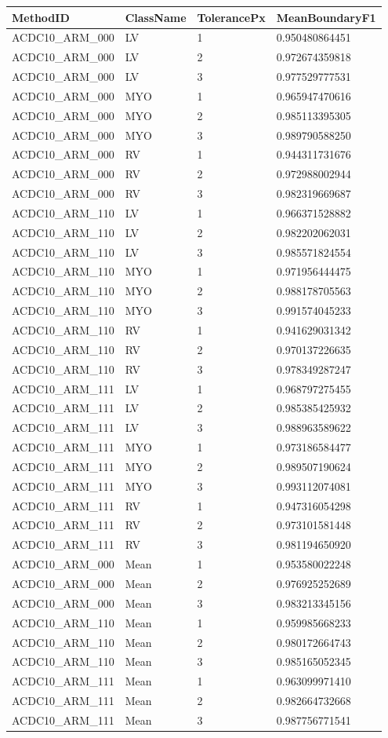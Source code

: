 \begin{tabular}{llll}
\toprule
MethodID & ClassName & TolerancePx & MeanBoundaryF1 \\
\midrule
ACDC10_ARM_000 & LV & 1 & 0.950480864451 \\
ACDC10_ARM_000 & LV & 2 & 0.972674359818 \\
ACDC10_ARM_000 & LV & 3 & 0.977529777531 \\
ACDC10_ARM_000 & MYO & 1 & 0.965947470616 \\
ACDC10_ARM_000 & MYO & 2 & 0.985113395305 \\
ACDC10_ARM_000 & MYO & 3 & 0.989790588250 \\
ACDC10_ARM_000 & RV & 1 & 0.944311731676 \\
ACDC10_ARM_000 & RV & 2 & 0.972988002944 \\
ACDC10_ARM_000 & RV & 3 & 0.982319669687 \\
ACDC10_ARM_110 & LV & 1 & 0.966371528882 \\
ACDC10_ARM_110 & LV & 2 & 0.982202062031 \\
ACDC10_ARM_110 & LV & 3 & 0.985571824554 \\
ACDC10_ARM_110 & MYO & 1 & 0.971956444475 \\
ACDC10_ARM_110 & MYO & 2 & 0.988178705563 \\
ACDC10_ARM_110 & MYO & 3 & 0.991574045233 \\
ACDC10_ARM_110 & RV & 1 & 0.941629031342 \\
ACDC10_ARM_110 & RV & 2 & 0.970137226635 \\
ACDC10_ARM_110 & RV & 3 & 0.978349287247 \\
ACDC10_ARM_111 & LV & 1 & 0.968797275455 \\
ACDC10_ARM_111 & LV & 2 & 0.985385425932 \\
ACDC10_ARM_111 & LV & 3 & 0.988963589622 \\
ACDC10_ARM_111 & MYO & 1 & 0.973186584477 \\
ACDC10_ARM_111 & MYO & 2 & 0.989507190624 \\
ACDC10_ARM_111 & MYO & 3 & 0.993112074081 \\
ACDC10_ARM_111 & RV & 1 & 0.947316054298 \\
ACDC10_ARM_111 & RV & 2 & 0.973101581448 \\
ACDC10_ARM_111 & RV & 3 & 0.981194650920 \\
ACDC10_ARM_000 & Mean & 1 & 0.953580022248 \\
ACDC10_ARM_000 & Mean & 2 & 0.976925252689 \\
ACDC10_ARM_000 & Mean & 3 & 0.983213345156 \\
ACDC10_ARM_110 & Mean & 1 & 0.959985668233 \\
ACDC10_ARM_110 & Mean & 2 & 0.980172664743 \\
ACDC10_ARM_110 & Mean & 3 & 0.985165052345 \\
ACDC10_ARM_111 & Mean & 1 & 0.963099971410 \\
ACDC10_ARM_111 & Mean & 2 & 0.982664732668 \\
ACDC10_ARM_111 & Mean & 3 & 0.987756771541 \\
\bottomrule
\end{tabular}
